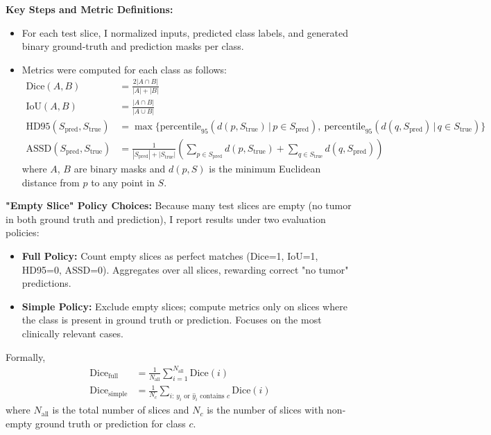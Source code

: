\vspace{0.5em}
\noindent\textbf{Key Steps and Metric Definitions:}
\begin{itemize}
    \item For each test slice, I normalized inputs, predicted class labels, and generated binary ground-truth and prediction masks per class.
    \item Metrics were computed for each class as follows:
    \begin{align*}
        \mathrm{Dice}(A, B) &= \frac{2|A \cap B|}{|A| + |B|} \\
        \mathrm{IoU}(A, B) &= \frac{|A \cap B|}{|A \cup B|} \\
        \mathrm{HD95}(S_\text{pred}, S_\text{true}) &= \max\Big\{
            \mathrm{percentile}_{95}(d(p, S_\text{true})\,|\,p \in S_\text{pred}),\ 
            \mathrm{percentile}_{95}(d(q, S_\text{pred})\,|\,q \in S_\text{true})\Big\} \\
        \mathrm{ASSD}(S_\text{pred}, S_\text{true}) &= 
            \frac{1}{|S_\text{pred}| + |S_\text{true}|}
            \left(\sum_{p \in S_\text{pred}} d(p, S_\text{true}) + \sum_{q \in S_\text{true}} d(q, S_\text{pred})\right)
    \end{align*}
    where $A$, $B$ are binary masks and $d(p, S)$ is the minimum Euclidean distance from $p$ to any point in $S$.
\end{itemize}

\vspace{0.5em}
\noindent\textbf{"Empty Slice" Policy Choices:}
Because many test slices are empty (no tumor in both ground truth and prediction), I report results under two evaluation policies:
\begin{itemize}
    \item \textbf{Full Policy:} Count empty slices as perfect matches (Dice=1, IoU=1, HD95=0, ASSD=0). Aggregates over all slices, rewarding correct "no tumor" predictions.
    \item \textbf{Simple Policy:} Exclude empty slices; compute metrics only on slices where the class is present in ground truth or prediction. Focuses on the most clinically relevant cases.
\end{itemize}
Formally,
\begin{align*}
    \text{Dice}_{\text{full}} &= \frac{1}{N_{\text{all}}} \sum_{i=1}^{N_{\text{all}}} \text{Dice}(i) \\
    \text{Dice}_{\text{simple}} &= \frac{1}{N_{c}} \sum_{i:\, y_i \text{ or } \hat{y}_i \text{ contains } c} \text{Dice}(i)
\end{align*}
where $N_{\text{all}}$ is the total number of slices and $N_c$ is the number of slices with non-empty ground truth or prediction for class $c$.

